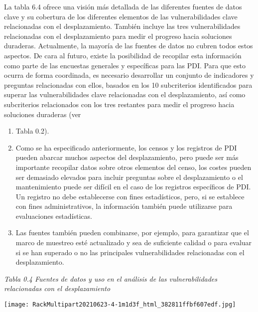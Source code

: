 \documentclass[
]{book}
\providecommand{\tightlist}{%
  \setlength{\itemsep}{0pt}\setlength{\parskip}{0pt}}
\begin{document}
La tabla 6.4 ofrece una visión más detallada de las diferentes fuentes de datos clave y su cobertura de los diferentes elementos de las vulnerabilidades clave relacionadas con el desplazamiento. También incluye las tres vulnerabilidades relacionadas con el desplazamiento para medir el progreso hacia soluciones duraderas. Actualmente, la mayoría de las fuentes de datos no cubren todos estos aspectos. De cara al futuro, existe la posibilidad de recopilar esta información como parte de las encuestas generales y específicas para las PDI. Para que esto ocurra de forma coordinada, es necesario desarrollar un conjunto de indicadores y preguntas relacionadas con ellos, basados en los 10 subcriterios identificados para superar las vulnerabilidades clave relacionadas con el desplazamiento, así como subcriterios relacionados con los tres restantes para medir el progreso hacia soluciones duraderas (ver

\begin{enumerate}
\def\labelenumi{\arabic{enumi}.}
\tightlist
\item
  Tabla 0.2).
\item
  Como se ha especificado anteriormente, los censos y los registros de PDI pueden abarcar muchos aspectos del desplazamiento, pero puede ser más importante recopilar datos sobre otros elementos del censo, los costes pueden ser demasiado elevados para incluir preguntas sobre el desplazamiento o el mantenimiento puede ser difícil en el caso de los registros específicos de PDI. Un registro no debe establecerse con fines estadísticos, pero, si se establece con fines administrativos, la información también puede utilizarse para evaluaciones estadísticas.
\item
  Las fuentes también pueden combinarse, por ejemplo, para garantizar que el marco de muestreo esté actualizado y sea de suficiente calidad o para evaluar si se han superado o no las principales vulnerabilidades relacionadas con el desplazamiento.
\end{enumerate}

\emph{Tabla 0.4 Fuentes de datos y uso en el análisis de las vulnerabilidades relacionadas con el desplazamiento}

\texttt{[image: RackMultipart20210623-4-1m1d3f\_html\_382811ffbf607edf.jpg]}
\end{document}
